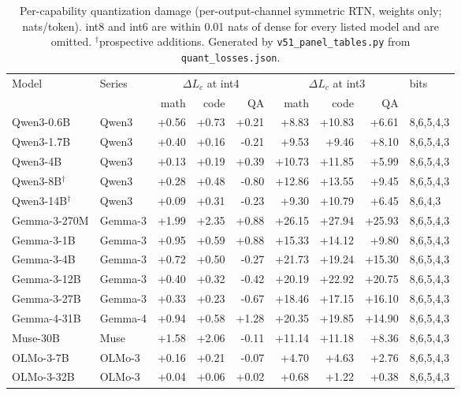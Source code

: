 \begin{table}[t]\centering\footnotesize\setlength{\tabcolsep}{3.5pt}
\begin{tabular}{@{}llrrrrrrl@{}}
\toprule
Model & Series & \multicolumn{3}{c}{$\Delta L_c$ at int4} & \multicolumn{3}{c}{$\Delta L_c$ at int3} & bits \\
\cmidrule(lr){3-5}\cmidrule(lr){6-8} & & math & code & QA & math & code & QA & \\
\midrule
Qwen3-0.6B & Qwen3 & +0.56 & +0.73 & +0.21 & +8.83 & +10.83 & +6.61 & 8,6,5,4,3 \\
Qwen3-1.7B & Qwen3 & +0.40 & +0.16 & -0.21 & +9.53 & +9.46 & +8.10 & 8,6,5,4,3 \\
Qwen3-4B & Qwen3 & +0.13 & +0.19 & +0.39 & +10.73 & +11.85 & +5.99 & 8,6,5,4,3 \\
Qwen3-8B$^{\dagger}$ & Qwen3 & +0.28 & +0.48 & -0.80 & +12.86 & +13.55 & +9.45 & 8,6,5,4,3 \\
Qwen3-14B$^{\dagger}$ & Qwen3 & +0.09 & +0.31 & -0.23 & +9.30 & +10.79 & +6.45 & 8,6,4,3 \\
Gemma-3-270M & Gemma-3 & +1.99 & +2.35 & +0.88 & +26.15 & +27.94 & +25.93 & 8,6,5,4,3 \\
Gemma-3-1B & Gemma-3 & +0.95 & +0.59 & +0.88 & +15.33 & +14.12 & +9.80 & 8,6,5,4,3 \\
Gemma-3-4B & Gemma-3 & +0.72 & +0.50 & -0.27 & +21.73 & +19.24 & +15.30 & 8,6,5,4,3 \\
Gemma-3-12B & Gemma-3 & +0.40 & +0.32 & -0.42 & +20.19 & +22.92 & +20.75 & 8,6,5,4,3 \\
Gemma-3-27B & Gemma-3 & +0.33 & +0.23 & -0.67 & +18.46 & +17.15 & +16.10 & 8,6,5,4,3 \\
Gemma-4-31B & Gemma-4 & +0.94 & +0.58 & +1.28 & +20.35 & +19.85 & +14.90 & 8,6,5,4,3 \\
Muse-30B & Muse & +1.58 & +2.06 & -0.11 & +11.14 & +11.18 & +8.36 & 8,6,5,4,3 \\
OLMo-3-7B & OLMo-3 & +0.16 & +0.21 & -0.07 & +4.70 & +4.63 & +2.76 & 8,6,5,4,3 \\
OLMo-3-32B & OLMo-3 & +0.04 & +0.06 & +0.02 & +0.68 & +1.22 & +0.38 & 8,6,5,4,3 \\
\bottomrule\end{tabular}
\caption{Per-capability quantization damage (per-output-channel symmetric RTN, weights only; nats/token). int8 and int6 are within 0.01 nats of dense for every listed model and are omitted. $^{\dagger}$prospective additions. Generated by \texttt{v51\_panel\_tables.py} from \texttt{quant\_losses.json}.}
\label{tab:panel_quant}\end{table}
